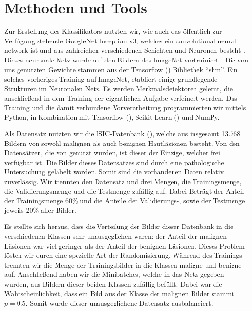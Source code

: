 \section{Methoden und Tools}

Zur Erstellung des Klassifikators nutzten wir, wie \citet{esteva2017dermatologist} auch das öffentlich zur Verfügung stehende GoogleNet Inception v3, welches ein convolutional neural network ist und aus zahlreichen verschiedenen Schichten und Neuronen besteht \citep{szegedy2016rethinking} . Dieses neuronale Netz wurde auf den Bildern des ImageNet vortrainiert \citep{russakovsky2015imagenet}. Die von uns genutzten Gewichte stammen aus der Tensorflow (\cite{tensorflow2015-whitepaper}) Bibliethek ``slim''.
Ein solches vorheriges Training auf ImageNet, etabliert einige grundlegende Strukturen im Neuronalen Netz. Es werden Merkmalsdetektoren gelernt, die anschließend in dem Training der eigentlichen Aufgabe verfeinert werden.  Das Training und die damit verbundene Vorverarbeitung programmierten wir mittels Python, in Kombination mit Tensorflow (\cite{tensorflow2015-whitepaper}), Scikit Learn (\cite{scikit-learn}) und NumPy. 

Als Datensatz nutzten wir die ISIC-Datenbank (\cite{ISIC}), welche aus insgesamt 13.768 Bildern von sowohl malignen als auch benignen Hautläsionen besteht. Von den Datensätzen, die von \citep{esteva2017dermatologist} genutzt wurden, ist dieser der Einzige, welcher frei verfügbar ist. Die Bilder dieses Datensatzes sind durch eine pathologische Untersuchung gelabelt worden. Somit sind die vorhandenen Daten relativ zuverlässig. Wir trennten den Datensatz und drei Mengen, die Trainingsmenge, die Validierungsmenge und die Testmenge zufällig auf. Dabei Beträgt der Anteil der Trainingsmenge 60\% und die Anteile der Validierungs-, sowie der Testmenge jeweils 20\% aller Bilder.

Es stellte sich heraus, dass die Verteilung der Bilder dieser Datenbank in die verschiedenen Klassen sehr unausgeglichen waren: der Anteil der malignen Läsionen war viel geringer als der Anteil der benignen Läsionen. Dieses Problem lösten wir durch eine spezielle Art der Randomisierung. Während des Trainings trennten wir die Menge der Trainingsbilder in die Klassen maligne und benigne auf. Anschließend haben wir die Minibatches, welche in das Netz gegeben wurden, aus Bildern dieser beiden Klassen zufällig befüllt. Dabei war die Wahrscheinlichkeit, dass ein Bild aus der Klasse der malignen Bilder stammt $p=0.5$. Somit wurde dieser unausgeglichene Datensatz ausbalanciert.

